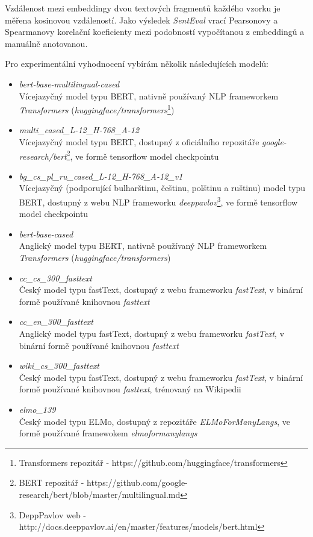 \documentclass[thesis=M,czech]{FITthesis}[2019/12/23]
\begin{document}
Vzdálenost mezi embeddingy dvou textových fragmentů každého vzorku je měřena kosinovou vzdáleností. Jako výsledek \textit{SentEval} vrací Pearsonovy a Spearmanovy korelační koeficienty mezi podobností vypočítanou z embeddingů a manuálně anotovanou.

Pro experimentální vyhodnocení vybírám několik následujících modelů:
\begin{itemize}
    \item \textit{bert-base-multilingual-cased}\\
    Vícejazyčný model typu BERT, nativně používaný NLP frameworkem \textit{Transformers} (\textit{huggingface/transformers}\footnote{Transformers repozitář - https://github.com/huggingface/transformers})
    \item \textit{multi\_cased\_L-12\_H-768\_A-12}\\
    Vícejazyčný model typu BERT, dostupný z oficiálního repozitáře \textit{google-research/bert}\footnote{BERT repozitář - https://github.com/google-research/bert/blob/master/multilingual.md}, ve formě tensorflow model checkpointu
    \item \textit{bg\_cs\_pl\_ru\_cased\_L-12\_H-768\_A-12\_v1}\\
    Vícejazyčný (podporující bulharštinu, češtinu, polštinu a ruštinu) model typu BERT, dostupný z webu NLP frameworku \textit{deeppavlov}\footnote{DeppPavlov web - http://docs.deeppavlov.ai/en/master/features/models/bert.html}, ve formě tensorflow model checkpointu
    \item \textit{bert-base-cased}\\
    Anglický model typu BERT, nativně používaný NLP frameworkem \textit{Transformers} (\textit{huggingface/transformers})
    \item \textit{cc\_cs\_300\_fasttext}\\
    Český model typu fastText, dostupný z webu frameworku \textit{fastText}, v binární formě používané knihovnou \textit{fasttext}
    \item \textit{cc\_en\_300\_fasttext}\\
    Anglický model typu fastText, dostupný z webu frameworku \textit{fastText}, v binární formě používané knihovnou \textit{fasttext}
    \item \textit{wiki\_cs\_300\_fasttext}\\
    Český model typu fastText, dostupný z webu frameworku \textit{fastText}, v binární formě používané knihovnou \textit{fasttext}, trénovaný na Wikipedii
    \item \textit{elmo\_139}\\
    Český model typu ELMo, dostupný z repozitáře \textit{ELMoForManyLangs}, ve formě používané framewokem \textit{elmoformanylangs}
\end{itemize}
\end{document}

